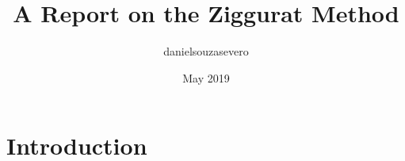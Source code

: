 \documentclass{article}
\title{A Report on the Ziggurat Method}
\author{danielsouzasevero }
\date{May 2019}
\begin{document}
\maketitle

\section{Introduction}
\end{document}
